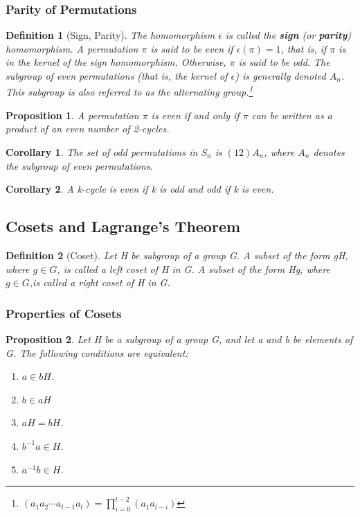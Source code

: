 \documentclass[12pt]{article}
\newtheorem{definition}{Definition}[subsection]
\newtheorem{proposition}{Proposition}[subsection]
\newtheorem{corollary}{Corollary}[subsection]
\begin{document}
    \subsubsection{Parity of Permutations}
        \begin{definition}[Sign, Parity]
            The homomorphism $\epsilon$ is called the \textbf{sign} (or \textbf{parity}) homomorphism. A permutation $\pi$ is said to be even if $\epsilon(\pi) = 1$, that is, if $\pi$ is in the kernel of the sign homomorphism. Otherwise, $\pi$ is said to be odd. The subgroup of even permutations (that is, the kernel of $\epsilon$) is generally denoted $A_n$. This subgroup is also referred to as the alternating group.\footnote{$(a_1a_2\cdots a_{l-1}a_{l}) = \prod_{i = 0}^{l - 2}(a_1a_{l - i})$}
        \end{definition}
        \begin{proposition}
            A permutation $\pi$ is even if and only if $\pi$ can be written as a product of an even number of 2-cycles.
        \end{proposition}

        \begin{corollary}
            The set of odd permutations in $S_n$ is $(12)A_n$, where $A_n$ denotes the subgroup of even permutations.
        \end{corollary}
    
        \begin{corollary}
            A k-cycle is even if k is odd and odd if k is even.
        \end{corollary}
    
    \subsection{Cosets and Lagrange’s Theorem}
    
    \begin{definition}[Coset]
        Let H be subgroup of a group G. A subset of the form gH, where $g \in G$, is called a left coset of H in G. A subset of the form Hg, where $g \in G$,is called a right coset of H in G.
    \end{definition}

    \subsubsection{Properties of Cosets}
    \begin{proposition}
        Let H be a subgroup of a group G, and let a and b be elements of G. The following conditions are equivalent:
        \begin{enumerate}
            \item $a\in bH$.
            \item $b\in aH$
            \item $aH = bH$.
            \item $b^{-1}a \in H$.
            \item $a^{-1}b \in H$.
        \end{enumerate}

    \end{proposition}
    
\end{document}
